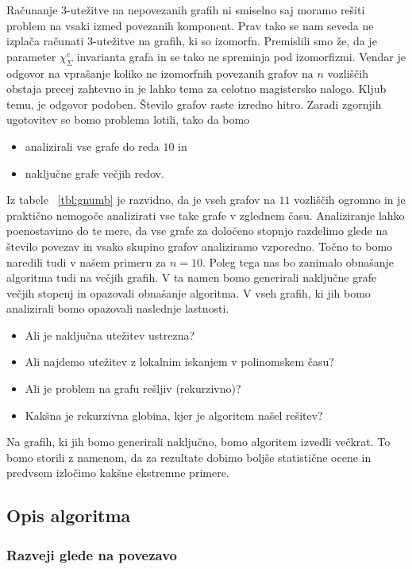 \documentclass[12pt,a4paper,twoside]{article}
\theoremstyle{definition} %
\theoremstyle{plain} %
\newcommand{\ec}{\chi_{\Sigma}^e}
\numberwithin{equation}{section}  %
\begin{document}
 Računanje $3$-utežitve na nepovezanih grafih ni smiselno saj moramo rešiti problem na vsaki izmed povezanih komponent. Prav tako se nam seveda ne izplača računati $3$-utežitve na grafih, ki so izomorfn. Premislili smo že, da je parameter $\ec$ invarianta grafa in se tako ne spreminja pod izomorfizmi. Vendar je odgovor na vprašanje koliko ne izomorfnih povezanih grafov na $n$ vozliščih obstaja precej zahtevno in je lahko tema za celotno magistersko nalogo. Kljub temu, je odgovor podoben. Število grafov raste izredno hitro. Zaradi zgornjih ugotovitev se bomo problema lotili, tako da bomo
\begin{itemize}
\item analizirali vse grafe do reda $10$ in
\item naključne grafe večjih redov.
\end{itemize}
Iz tabele ~\ref{tbl:gnumb} je razvidno, da je vseh grafov na $11$ vozliščih ogromno in je praktično nemogoče analizirati vse take grafe v zglednem času. Analiziranje lahko poenostavimo do te mere, da vse grafe za določeno stopnjo razdelimo glede na število povezav in vsako skupino grafov analiziramo vzporedno. Točno to bomo naredili tudi v našem primeru za $n=10$. Poleg tega nas bo zanimalo obnašanje algoritma tudi na večjih grafih. V ta namen bomo generirali naključne grafe večjih stopenj in opazovali obnašanje algoritma. V vseh grafih, ki jih bomo analizirali bomo opazovali naslednje lastnosti.
\begin{itemize}
\item Ali je naključna utežitev  ustrezna?
\item Ali najdemo utežitev z lokalnim iskanjem v polinomskem času?
\item Ali je problem na grafu rešljiv (rekurzivno)?
\item Kakšna je rekurzivna globina, kjer je algoritem našel rešitev?
\end{itemize}
Na grafih, ki jih bomo generirali naključno, bomo algoritem izvedli večkrat. To bomo storili z namenom, da za rezultate dobimo boljše statistične ocene in predvsem izločimo kakšne ekstremne primere.

\subsection{Opis algoritma}
\subsubsection{Razveji glede na povezavo}
\end{document}
